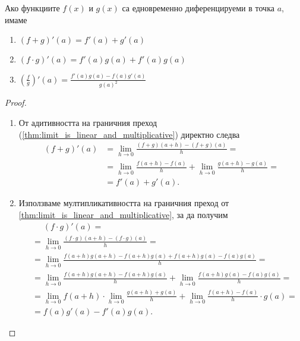 \documentclass{../../common/topic}
\begin{document}
\begin{theorem}
  Ако функциите \( f(x) \) и \( g(x) \) са едновременно диференцируеми в точка \( a \), имаме
  \begin{enumerate}
    \item \( (f+g)'(a) = f'(a) + g'(a) \)
    \item \( (f \cdot g)'(a) = f'(a) g(a) + f'(a) g(a) \)
    \item \( (\frac f g)'(a) = \frac{f'(a) g(a) - f(a) g'(a)} {{g(a)}^2} \)
  \end{enumerate}
\end{theorem}
\begin{proof}
  \hfill
  \begin{enumerate}
    \item От адитивността на граничния преход (\cref{thm:limit_is_linear_and_multiplicative}) директно следва
    \begin{align*}
      (f+g)'(a)
      &=
      \lim_{h \to 0} \frac {(f+g)(a+h) - (f+g)(a)} h
      = \\ &=
      \lim_{h \to 0} \frac {f(a+h)-f(a)} h + \lim_{h \to 0} \frac{g(a+h) - g(a)} h
      = \\ &=
      f'(a) + g'(a).
    \end{align*}

    \item Използваме мултипликативността на граничния преход от \cref{thm:limit_is_linear_and_multiplicative}, за да получим
    \begin{align*}
      &\phantom{{}={}} (f \cdot g)'(a)
      = \\ &=
      \lim_{h \to 0} \frac {(f \cdot g)(a+h) - (f \cdot g)(a)} h
      = \\ &=
      \lim_{h \to 0} \frac {f(a+h) g(a+h) - f(a+h) g(a) + f(a+h) g(a) - f(a) g(a)} h
      = \\ &=
      \lim_{h \to 0} \frac {f(a+h) g(a+h) - f(a+h) g(a)} h + \lim_{h \to 0} \frac {f(a+h) g(a) - f(a) g(a)} h
      = \\ &=
      \lim_{h \to 0} f(a+h) \cdot \lim_{h \to 0} \frac {g(a+h) + g(a)} h + \lim_{h \to 0} \frac {f(a+h) - f(a)} h \cdot g(a)
      = \\ &=
      f(a) g'(a) - f'(a) g(a).
    \end{align*}


\end{enumerate}
\end{proof}
\end{document}

